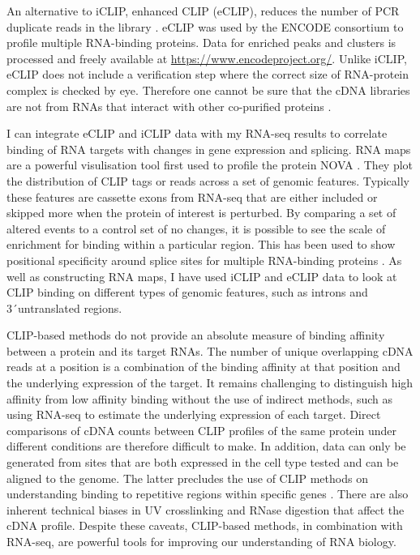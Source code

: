 An alternative to iCLIP, enhanced CLIP (eCLIP), reduces the number of PCR duplicate reads in the library  \citep{Van_Nostrand2016-su}. 
eCLIP was used by the ENCODE consortium to profile multiple RNA-binding proteins. 
Data for enriched peaks and clusters is processed and freely available at \url{https://www.encodeproject.org/}. 
Unlike iCLIP, eCLIP does not include a verification step where the correct size of RNA-protein complex is checked by eye.
Therefore one cannot be sure that the cDNA libraries are not from RNAs that interact with other co-purified proteins \citep{Chakrabarti2018}.

I can integrate eCLIP and iCLIP data with my RNA-seq results to correlate binding of RNA targets with changes in gene expression and splicing.
RNA maps are a powerful visulisation tool first used to profile the protein NOVA \citep{Ule2006}.
They plot the distribution of CLIP tags or reads across a set of genomic features.
Typically these features are cassette exons from RNA-seq that are either included or skipped more when the protein of interest is perturbed.
By comparing a set of altered events to a control set of no changes, it is possible to see the scale of enrichment for binding within a particular region. 
This has been used to show positional specificity around splice sites for multiple RNA-binding proteins \citep{Ule2006, Wang2010,Konig2010}.
As well as constructing RNA maps, I have used iCLIP and eCLIP data to look at CLIP binding on different types of genomic features, such as introns and 3\'\ untranslated regions.

CLIP-based methods do not provide an absolute measure of binding affinity between a protein and its target RNAs. 
The number of unique overlapping cDNA reads at a position is a combination of the binding affinity at that position and the underlying expression of the target.
It remains challenging to distinguish high affinity from low affinity binding without the use of indirect methods, such as using RNA-seq to estimate the underlying expression of each target.
Direct comparisons of cDNA counts between CLIP profiles of the same protein under different conditions are therefore difficult to make.
In addition, data can only be generated from sites that are both expressed in the cell type tested and can be aligned to the genome. 
The latter precludes the use of CLIP methods on understanding binding to repetitive regions within specific genes \citep{Chakrabarti2018}.
There are also inherent technical biases in UV crosslinking and RNase digestion that affect the cDNA profile.
Despite these caveats, CLIP-based methods, in combination with RNA-seq, are powerful tools for improving our understanding of RNA biology.

